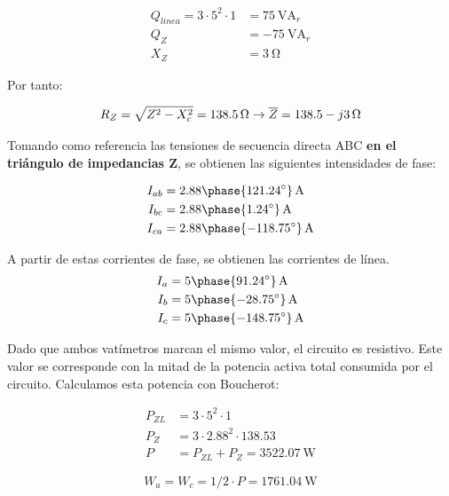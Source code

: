 \documentclass[12pt]{article}
\begin{document}
\begin{align*}
  Q_{linea} = 3 \cdot 5^2 \cdot 1 &= \SI{75}{\volt\ampere}_r\\
  Q_Z &= -\SI{75}{\volt\ampere}_r\\
  X_Z &= \SI{3}{\ohm}
\end{align*}

Por tanto:

\[
  R_Z = \sqrt{Z^2 - X_c^2} = \SI{138.5}{\ohm} \rightarrow \overline{Z} = \SI[parse-numbers=false]{138.5 - j3}{\ohm}
\]

Tomando como referencia las tensiones de secuencia directa ABC
\textbf{en el triángulo de impedancias Z}, se obtienen las siguientes
intensidades de fase:

\begin{align*}
  I_{ab} &= \SI[parse-numbers=false]{2.88\phase{121.24^\circ}}{\ampere}\\
  I_{bc} &= \SI[parse-numbers=false]{2.88\phase{1.24^\circ}}{\ampere}\\
  I_{ca} &= \SI[parse-numbers=false]{2.88\phase{-118.75^\circ}}{\ampere}\\
\end{align*}

A partir de estas corrientes de fase, se obtienen las corrientes de línea.
\begin{align*}
  I_{a} &= \SI[parse-numbers=false]{5\phase{91.24^\circ}}{\ampere}\\
  I_{b} &= \SI[parse-numbers=false]{5\phase{-28.75^\circ}}{\ampere}\\
  I_{c} &= \SI[parse-numbers=false]{5\phase{-148.75^\circ}}{\ampere}
\end{align*}



Dado que ambos vatímetros marcan el mismo valor, el circuito es
resistivo. Este valor se corresponde con la mitad de la potencia
activa total consumida por el circuito. Calculamos esta potencia con Boucherot:


\begin{align*}
  P_{ZL} &= 3 \cdot 5^2 \cdot 1\\
  P_Z &= 3 \cdot 2.88^2 \cdot 138.53\\
  P &= P_{ZL} + P_{Z} = \SI{3522.07}{\watt}
\end{align*}

\[
  W_a = W_c = 1/2 \cdot P = \SI{1761.04}{\watt}
\]

\clearpage

\section{}
\end{document}
